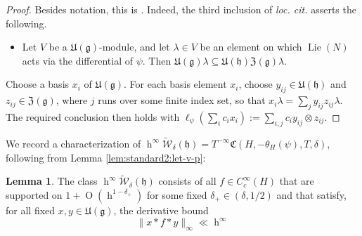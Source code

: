 \documentclass[reqno]{amsart}
\DeclareMathOperator{\h}{h}
\DeclareMathOperator{\Lie}{Lie}
\def\O{\operatorname{O}}
\theoremstyle{plain} \newtheorem{theorem} {Theorem}
\theoremstyle{definition} \newtheorem{definition} [theorem] {Definition}
\theoremstyle{itplain} %
\newtheorem{lemma}[theorem]{Lemma}
\numberwithin{equation}{section}
\numberwithin{theorem}{section}
\begin{document}
\begin{proof}
  Besides notation, this is \cite[Lemma 3]{MR2733072}.  Indeed, the third inclusion of \emph{loc. cit.} asserts the following.
  \begin{itemize}
  \item Let $V$ be a $\mathfrak{U}(\mathfrak{g})$-module, and let $\lambda \in V$ be an element on which $\Lie(N)$ acts via the differential of $\psi$.  Then $\mathfrak{U}(\mathfrak{g}) \lambda \subseteq \mathfrak{U}(\mathfrak{h}) \mathfrak{Z}(\mathfrak{g}) \lambda$.
  \end{itemize}
  Choose a basis $x_i$ of $\mathfrak{U}(\mathfrak{g})$.  For each basis element $x_i$, choose $y_{i j} \in \mathfrak{U}(\mathfrak{h})$ and $z_{i j} \in \mathfrak{Z}(\mathfrak{g})$, where $j$ runs over some finite index set, so that $x_i \lambda = \sum_j y_{i j} z_{i j} \lambda$.  The required conclusion then holds with $\ell_\psi(\sum_i c_i x_i) := \sum_{i,j} c_i y_{i j} \otimes z_{i j}$.
\end{proof}

We record a characterization of $\h^\infty \tilde{\mathcal{W}}_\delta(\mathfrak{h}) = T^{-\infty} \mathfrak{C}(H, -\theta_H(\psi), T, \delta)$, following from Lemma \ref{lem:standard2:let-v-p}:
\begin{lemma}\label{lem:scratch-research:hinfty-tild-cons}
  The class $\h^\infty \tilde{\mathcal{W}}_{\delta}(\mathfrak{h})$ consists of all $f \in C_c^\infty(H)$ that are supported on $1 + \O(\h^{1 - \delta_+})$ for some fixed $\delta_+ \in (\delta,1/2)$ and that satisfy, for all fixed $x,y \in \mathfrak{U}(\mathfrak{g})$, the derivative bound
  \begin{equation}\label{eq:x-ast-f}
    \|x \ast f \ast y\|_{\infty} \ll \h^\infty
  \end{equation}
\end{lemma}
\end{document}
